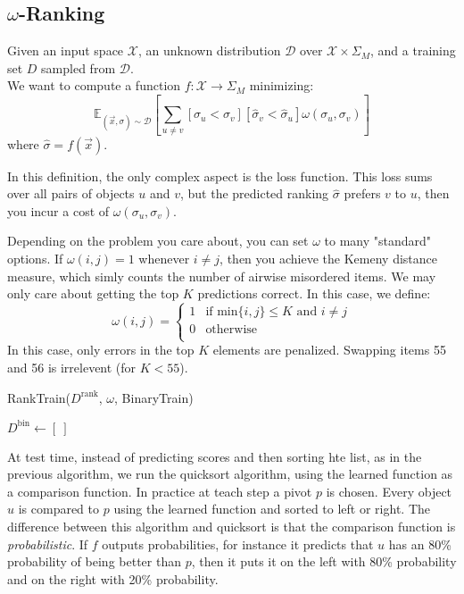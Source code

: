 \subsection{\(\omega\)-Ranking}
Given an input space \(\mathcal{X}\), an unknown distribution \(\mathcal{D}\) over \(\mathcal{X} \times \Sigma_M\), and a training set \(D\) sampled from \(\mathcal{D}\).\\
We want to compute a function \(f : \mathcal{X} \to \Sigma_M\) minimizing:
\begin{equation}
    \mathbb{E}_{(\vec{x},\sigma) \sim \mathcal{D}} \left[ \sum_{u \neq v} [\sigma_u < \sigma_v][\hat{\sigma}_v < \hat{\sigma}_u] \omega ( \sigma_u , \sigma_v ) \right]
\end{equation}
where \(\hat{\sigma} = f(\vec{x})\).

In this definition, the only complex aspect is the loss function. This loss sums over all pairs of objects \(u\) and \(v\), but the predicted ranking \(\hat{\sigma}\) prefers \(v\) to \(u\), then you incur a cost of \(\omega(\sigma_u,\sigma_v)\).

Depending on the problem you care about, you can set \(\omega\) to many "standard" options. If \(\omega(i,j) = 1\) whenever \(i \neq j\), then you achieve the Kemeny distance measure, which simly counts the number of airwise misordered items. We may only care about getting the top \(K\) predictions correct. In this case, we define:
\begin{equation}
    \omega(i,j) = \begin{cases}
        1 &\text{if min}\{i,j\} \leq K \text{ and } i \neq j\\
        0 &\text{otherwise}\\
    \end{cases}
\end{equation}
In this case, only errors in the top \(K\) elements are penalized. Swapping items 55 and 56 is irrelevent (for \(K < 55\)).

\begin{algorithm}
    \caption{RankTrain($D^\text{rank}$, $\omega$, BinaryTrain)}
    \label{alg:rank_train}
$D^\text{bin} \gets [\ ]$\;
\end{algorithm}

At test time, instead of predicting scores and then sorting hte list, as in the previous algorithm, we run the quicksort algorithm, using the learned function as a comparison function. In practice at teach step a pivot \(p\) is chosen. Every object \(u\) is compared to \(p\) using the learned function and sorted to left or right. The difference between this algorithm and quicksort is that the comparison function is \emph{probabilistic}. If \(f\) outputs probabilities, for instance it predicts that \(u\) has an 80\% probability of being better than \(p\), then it puts it on the left with 80\% probability and on the right with 20\% probability.

